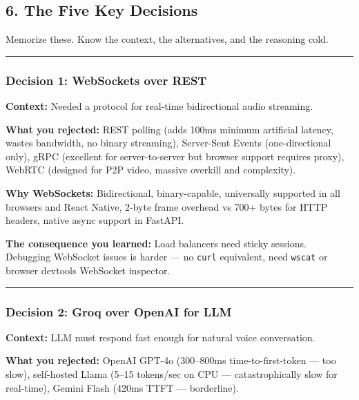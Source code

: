 \documentclass[
  11pt,
]{article}
\newcommand{\passthrough}[1]{#1}
\begin{document}
\hypertarget{the-five-key-decisions}{%
\subsection{6. The Five Key Decisions}\label{the-five-key-decisions}}

Memorize these. Know the context, the alternatives, and the reasoning
cold.

\begin{center}\rule{0.5\linewidth}{0.5pt}\end{center}

\hypertarget{decision-1-websockets-over-rest}{%
\subsubsection{Decision 1: WebSockets over
REST}\label{decision-1-websockets-over-rest}}

\textbf{Context:} Needed a protocol for real-time bidirectional audio
streaming.

\textbf{What you rejected:} REST polling (adds 100ms minimum artificial
latency, wastes bandwidth, no binary streaming), Server-Sent Events
(one-directional only), gRPC (excellent for server-to-server but browser
support requires proxy), WebRTC (designed for P2P video, massive
overkill and complexity).

\textbf{Why WebSockets:} Bidirectional, binary-capable, universally
supported in all browsers and React Native, 2-byte frame overhead vs
700+ bytes for HTTP headers, native async support in FastAPI.

\textbf{The consequence you learned:} Load balancers need sticky
sessions. Debugging WebSocket issues is harder --- no
\passthrough{\lstinline!curl!} equivalent, need
\passthrough{\lstinline!wscat!} or browser devtools WebSocket inspector.

\begin{center}\rule{0.5\linewidth}{0.5pt}\end{center}

\hypertarget{decision-2-groq-over-openai-for-llm}{%
\subsubsection{Decision 2: Groq over OpenAI for
LLM}\label{decision-2-groq-over-openai-for-llm}}

\textbf{Context:} LLM must respond fast enough for natural voice
conversation.

\textbf{What you rejected:} OpenAI GPT-4o (300--800ms
time-to-first-token --- too slow), self-hosted Llama (5--15 tokens/sec
on CPU --- catastrophically slow for real-time), Gemini Flash (420ms
TTFT --- borderline).
\end{document}
